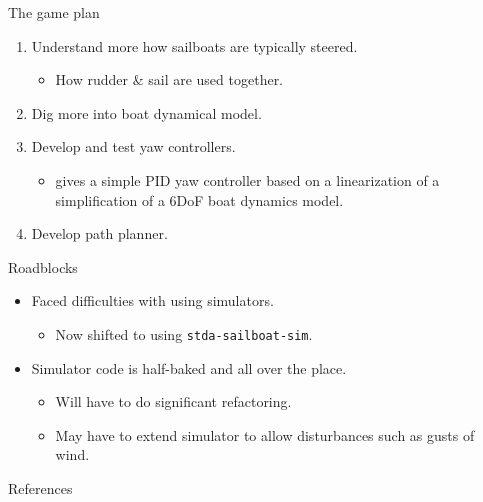 \documentclass[10pt,xcolor={table,dvipsnames},t]{beamer}
\begin{document}
\begin{frame}{The game plan}

\begin{enumerate}
    \item Understand more how sailboats are typically steered.
        \begin{itemize}
            \item How rudder \& sail are used together.
        \end{itemize}
    \item Dig more into boat dynamical model.
    \item Develop and test yaw controllers.
        \begin{itemize}
            \item \cite{Buehler2018} gives a simple PID yaw controller based on a linearization of a simplification of a 6DoF boat dynamics model.
        \end{itemize}
    \item Develop path planner.
\end{enumerate}

\end{frame}

\begin{frame}{Roadblocks}
    
    \begin{itemize}
        \item Faced difficulties with using simulators.
            \begin{itemize}
                \item Now shifted to using \texttt{stda-sailboat-sim}.
            \end{itemize}
        \item Simulator code is half-baked and all over the place.
            \begin{itemize}
                \item Will have to do significant refactoring.
                \item May have to extend simulator to allow disturbances such as gusts of wind.
            \end{itemize}
    \end{itemize}
\end{frame}

\begin{frame}{References}
    \printbibliography{}
\end{frame}
\end{document}
